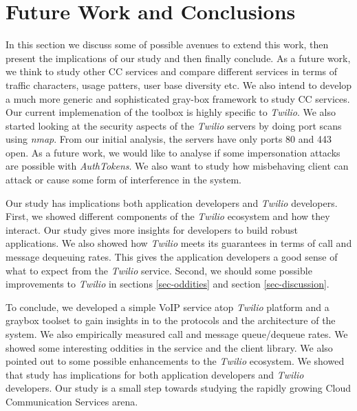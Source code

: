 \section{Future Work and Conclusions}
\label{sec-futureandconclusion}

In this section we discuss some of possible avenues to extend this work, then present the implications of our study and then finally conclude. As a future work, we think to study other CC services and compare different services in terms of traffic characters, usage patters, user base diversity etc. We also intend to develop a much more generic and sophisticated gray-box framework to study CC services. Our current implemenation of the toolbox is highly specific to \textit{Twilio}. We also started looking at the security aspects of the \textit{Twilio} servers by doing port scans using \textit{nmap}. From our initial analysis, the servers have only ports 80 and 443 open. As a future work, we would like to analyse if some impersonation attacks are possible with \textit{AuthTokens}. We also want to study how misbehaving client can attack or cause some form of interference in the system.

Our study has implications both application developers and \textit{Twilio} developers. First, we showed different components of the \textit{Twilio} ecosystem and how they interact. Our study gives more insights for developers to build robust applications. We also showed how \textit{Twilio} meets its guarantees in terms of call and message dequeuing rates. This gives the application developers a good sense of what to expect from the \textit{Twilio} service. Second, we should some possible improvements to \textit{Twilio} in sections \ref{sec-oddities} and section \ref{sec-discussion}.

To conclude, we developed a simple VoIP service atop \textit{Twilio} platform and a graybox toolset to gain insights in to the protocols and the architecture of the system. We also empirically measured call and message queue/dequeue rates. We showed some interesting oddities in the service and the client library. We also pointed out to some possible enhancements to the \textit{Twilio} ecosystem. We showed that study has implications for both application developers and \textit{Twilio} developers. Our study is a small step towards studying the rapidly growing Cloud Communication Services arena. 